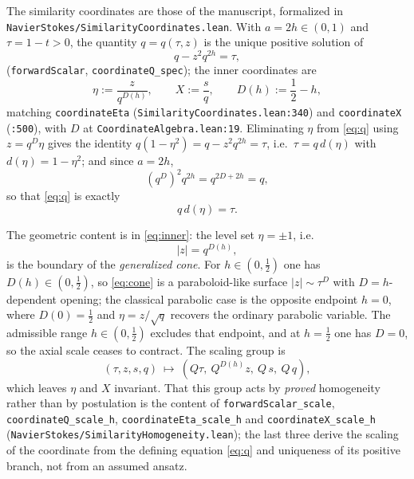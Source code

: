 \documentclass[11pt]{article}
\newcommand{\abs}[1]{\left\lvert #1\right\rvert}
\newcommand{\ct}[1]{\texttt{#1}}
\newcommand{\file}[1]{\texttt{\small #1}}
\theoremstyle{plain}
\theoremstyle{definition}
\theoremstyle{remark}
\begin{document}
The similarity coordinates are those of the manuscript, formalized in
\file{NavierStokes/SimilarityCoordinates.lean}. With
$a=2h\in(0,1)$ and $\tau=1-t>0$, the quantity $q=q(\tau,z)$ is the unique
positive solution of
\begin{equation}
  q-z^{2}q^{2h}=\tau ,
  \label{eq:q}
\end{equation}
(\ct{forwardScalar}, \ct{coordinateQ\_spec}); the inner coordinates are
\begin{equation}
  \eta:=\frac{z}{q^{D(h)}},\qquad X:=\frac{s}{q},
  \qquad D(h):=\frac12-h,
  \label{eq:inner}
\end{equation}
matching \ct{coordinateEta} (\file{SimilarityCoordinates.lean:340}) and
\ct{coordinateX} (\file{:500}), with $D$ at
\file{CoordinateAlgebra.lean:19}. Eliminating $\eta$ from \eqref{eq:q} using
$z=q^{D}\eta$ gives the identity
$q(1-\eta^{2})=q-z^{2}q^{2h}=\tau$, i.e.\ $\tau=q\,d(\eta)$ with
$d(\eta)=1-\eta^{2}$; and since $a=2h$,
\[
  (q^{D})^{2}q^{2h}=q^{2D+2h}=q ,
\]
so that \eqref{eq:q} is exactly
\begin{equation}
  q\,d(\eta)=\tau .
  \label{eq:qeta}
\end{equation}

The geometric content is in \eqref{eq:inner}: the level set $\eta=\pm1$, i.e.\
\begin{equation}
  \abs{z}=q^{D(h)},
  \label{eq:cone}
\end{equation}
is the boundary of the \emph{generalized cone}. For $h\in(0,\tfrac12)$ one has
$D(h)\in(0,\tfrac12)$, so \eqref{eq:cone} is a paraboloid-like surface
$|z|\sim\tau^{D}$ with $D=h$-dependent opening; the classical parabolic case is
the opposite endpoint $h=0$, where $D(0)=\tfrac12$ and $\eta=z/\sqrt{q}$
recovers the ordinary parabolic variable. The admissible range $h\in(0,\tfrac12)$
excludes that endpoint, and at $h=\tfrac12$ one has $D=0$, so the axial scale
ceases to contract. The scaling
group is
\begin{equation}
  (\tau,z,s,q)\ \longmapsto\
  (Q\tau,\ Q^{D(h)}z,\ Q\,s,\ Q\,q),
  \label{eq:scaling}
\end{equation}
which leaves $\eta$ and $X$ invariant. That this group acts by \emph{proved}
homogeneity rather than by postulation is the content of
\ct{forwardScalar\_scale}, \ct{coordinateQ\_scale\_h},
\ct{coordinateEta\_scale\_h} and \ct{coordinateX\_scale\_h}
(\file{NavierStokes/SimilarityHomogeneity.lean}); the last three derive the
scaling of the coordinate from the defining equation \eqref{eq:q} and
uniqueness of its positive branch, not from an assumed ansatz.
\end{document}
